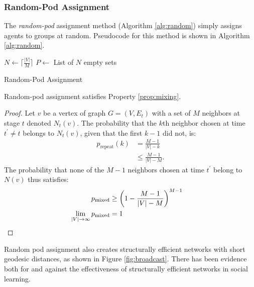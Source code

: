 \subsubsection{Random-Pod Assignment}
The {\em random-pod} assignment method (Algorithm \ref{alg:random}) simply assigns agents to groups at random. Pseudocode for this method is shown in Algorithm \ref{alg:random}.

\begin{algorithm}
\SetAlgoLined
\DontPrintSemicolon
{}
    $N \longleftarrow \lceil \frac{|V|}{M} \rceil$ \;
    $P \longleftarrow$ List of $N$ empty sets \;
\caption{Random-Pod Assignment}
\label{alg:random}
\end{algorithm}

\begin{claim}
Random-pod assignment satisfies Property \ref{prop:mixing}.
\end{claim}

\begin{proof}
Let $v$ be a vertex of graph $G=(V,E_t)$ with a set of $M$ neighbors at stage $t$ denoted $N_t(v)$.
The probability that the $k$th neighbor chosen at time $t^\prime \neq t$ belongs to $N_t(v)$, given that the first $k - 1$ did not, is:
\begin{align*}
p_\text{repeat}(k)
&= \frac{M - 1}{|V| - k} \\
&\leq \frac{M - 1}{|V| - M}.
\end{align*}
The probability that none of the $M-1$ neighbors chosen at time $t^\prime$ belong to $N(v)$ thus satisfies:
\begin{align*}
p_\text{mixed}
&\geq
\left( 1 - \frac{M - 1}{|V| - M} \right)^{M-1} \\
\lim_{|V|\rightarrow\infty} p_\text{mixed}
&= 1
&\qedhere
\end{align*}
\end{proof}

Random pod assignment also creates structurally efficient networks with short geodesic distances, as shown in Figure \ref{fig:broadcast}.
There has been evidence both for
\cite{lazer_network_2007, derex_partial_2016, mason_propagation_2008, barkoczi_social_2016}
and against
\cite{mason_collaborative_2012, barkoczi_social_2016}
the effectiveness of structurally efficient networks in social learning.

